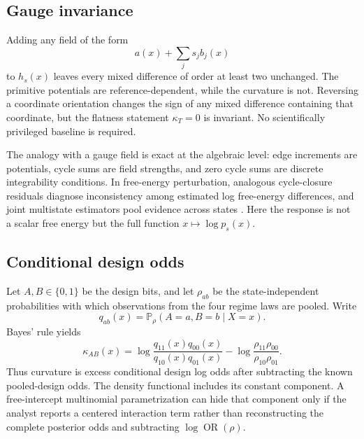 \documentclass[11pt]{article}
\newcommand{\Pp}{\mathbb{P}}
\newcommand{\OR}{\operatorname{OR}}
\begin{document}
\subsection{Gauge invariance}

Adding any field of the form
\begin{equation}
a(x)+\sum_j s_jb_j(x)
\end{equation}
to \(h_s(x)\) leaves every mixed difference of order at least two unchanged.  The primitive potentials are reference-dependent, while the curvature is not.  Reversing a coordinate orientation changes the sign of any mixed difference containing that coordinate, but the flatness statement \(\kappa_T=0\) is invariant.  No scientifically privileged baseline is required.

The analogy with a gauge field is exact at the algebraic level: edge increments are potentials, cycle sums are field strengths, and zero cycle sums are discrete integrability conditions.  In free-energy perturbation, analogous cycle-closure residuals diagnose inconsistency among estimated log free-energy differences, and joint multistate estimators pool evidence across states \citep{shirts2008mbar}.  Here the response is not a scalar free energy but the full function \(x\mapsto\log p_s(x)\).

\subsection{Conditional design odds}

Let \(A,B\in\{0,1\}\) be the design bits, and let \(\rho_{ab}\) be the state-independent probabilities with which observations from the four regime laws are pooled.  Write
\begin{equation}
q_{ab}(x)=\Pp_\rho(A=a,B=b\mid X=x).
\end{equation}
Bayes' rule yields
\begin{equation}
\boxed{
\kappa_{AB}(x)=
\log\frac{q_{11}(x)q_{00}(x)}{q_{10}(x)q_{01}(x)}
-
\log\frac{\rho_{11}\rho_{00}}{\rho_{10}\rho_{01}}.
}
\label{eq:sampling-odds-anchor}
\end{equation}
Thus curvature is excess conditional design log odds after subtracting the known pooled-design odds.  The density functional includes its constant component.  A free-intercept multinomial parametrization can hide that component only if the analyst reports a centered interaction term rather than reconstructing the complete posterior odds and subtracting \(\log\OR(\rho)\).
\end{document}
